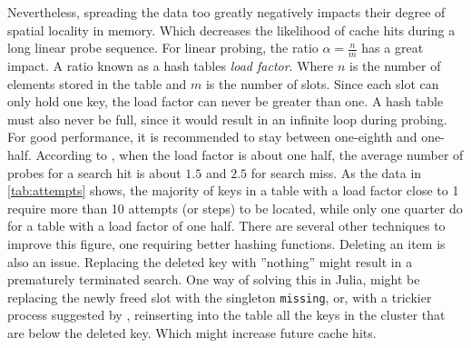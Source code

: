 \documentclass[a4paper, 11pt]{article}
\begin{document}
    Nevertheless, spreading the data too greatly negatively
    impacts their degree of spatial locality in memory. Which decreases the 
    likelihood of cache hits during a long linear probe sequence. For linear probing, 
    the ratio $\alpha = \frac{n}{m}$ has a great impact. 
    A ratio known as a hash tables \emph{load factor}. 
    Where $n$ is the number of elements stored in the table and $m$ is the number of slots. 
    Since each slot can only hold one key, the load factor can never be greater than one. 
    A hash table must also never be full, since it would result in an infinite loop during probing. 
    For good performance, it is recommended to stay between one-eighth and one-half. According 
    to \textcite{Segeqick2011Alg4th}, when the load factor is about one half, 
    the average number of probes for a search hit is about $1.5$ and $2.5$ for search miss. As 
    the data in \autoref{tab:attempts} shows, 
    the majority of keys in a table with a load factor close to 1 require more than 10 attempts (or steps)
    to be located, while only one quarter do for a table with a load factor of one half. There are 
    several other techniques to improve this figure, one requiring better hashing functions. 
    Deleting an item is also an issue. Replacing the deleted key with ''nothing'' might result in 
    a prematurely terminated search. One way of solving this in Julia, might be  
    replacing the newly freed slot with the singleton \texttt{missing}, or,
    with a trickier process suggested by \textcite{Segeqick2011Alg4th}, reinserting into 
    the table all the keys in the cluster that are below the deleted key. Which might
    increase future cache hits.
  

\printbibliography
\end{document}
